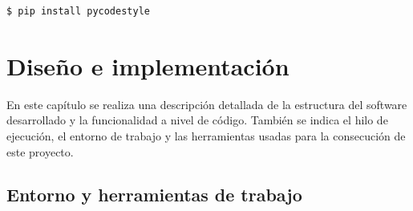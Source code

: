 \documentclass[a4paper, 12pt]{book}
\begin{document}
\begin{lstlisting}[style=consola,numbers=none]
$ pip install pycodestyle
\end{lstlisting}





\cleardoublepage
\chapter{Diseño e implementación}

En este capítulo se realiza una descripción detallada de la estructura del software desarrollado y la funcionalidad a nivel de código. También se indica el hilo de ejecución, el entorno de trabajo y las herramientas usadas para la consecución de este proyecto.

\section{Entorno y herramientas de trabajo} 
\label{sec:entorno}
\end{document}
